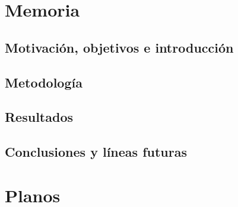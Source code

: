 \documentclass[12pt,a4paper,titlepage,twoside]{book}
\newcommand{\blankpage}{
\newpage \thispagestyle{empty}
\emph{  }
\newpage
}
\begin{document}
\part{Memoria}
\chapter{Motivación, objetivos e introducción}
		
\label{cap:intro}
\chapter{Metodología}
	
\label{cap:metodologia}
\chapter{Resultados}
	
\label{cap:resultados}
\chapter{Conclusiones y líneas futuras}
	
\label{cap:conclusiones}




\part{Planos}
\label{parte:planos}
\blankpage \blankpage %
\blankpage \blankpage %
\blankpage \blankpage %
\blankpage \blankpage %
\blankpage \blankpage %





\end{document}
